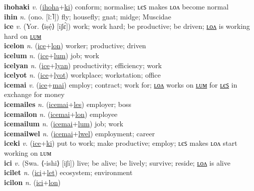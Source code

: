 \textbf{ihohaki} \textit{v.} (\hyperref[ihoha]{ihoha}+\hyperref[ki]{ki})
conform; normalise; ʟєꜱ makes ʟᴏᴧ become normal \label{ihohaki} \\
\textbf{ihin} \textit{n.} (ono. [ĩː˥])
fly; housefly; gnat; midge; Muscidae \label{ihin} \\
\textbf{ice} \textit{v.} (Yor. ⟨iṣẹ́⟩ [īʃɛ́])
work; work hard; be productive; be driven; \hyperref[icelon]{ʟᴏᴧ} is working hard on \hyperref[icelum]{ʟᴜᴍ} \label{ice} \\
\textbf{icelon} \textit{n.} (\hyperref[ice]{ice}+\hyperref[lon]{lon})
worker; productive; driven \label{icelon} \\
\textbf{icelum} \textit{n.} (\hyperref[ice]{ice}+\hyperref[lum]{lum})
job; work \label{icelum} \\
\textbf{icelyan} \textit{n.} (\hyperref[ice]{ice}+\hyperref[lyan]{lyan})
productivity; efficiency; work \label{icelyan} \\
\textbf{icelyot} \textit{n.} (\hyperref[ice]{ice}+\hyperref[lyot]{lyot})
workplace; workstation; office \label{icelyot} \\
\textbf{icemai} \textit{v.} (\hyperref[ice]{ice}+\hyperref[mai]{mai})
employ; contract; work for; \hyperref[icemailon]{ʟᴏᴧ} works on \hyperref[icemailum]{ʟᴜᴍ} for \hyperref[icemailes]{ʟєꜱ} in exchange for money \label{icemai} \\
\textbf{icemailes} \textit{n.} (\hyperref[icemai]{icemai}+\hyperref[les]{les})
employer; boss \label{icemailes} \\
\textbf{icemailon} \textit{n.} (\hyperref[icemai]{icemai}+\hyperref[lon]{lon})
employee \label{icemailon} \\
\textbf{icemailum} \textit{n.} (\hyperref[icemai]{icemai}+\hyperref[lum]{lum})
job; work \label{icemailum} \\
\textbf{icemailwel} \textit{n.} (\hyperref[icemai]{icemai}+\hyperref[lwel]{lwel})
employment; career \label{icemailwel} \\
\textbf{iceki} \textit{v.} (\hyperref[ice]{ice}+\hyperref[ki]{ki})
put to work; make productive; employ; ʟєꜱ makes ʟᴏᴧ start working on ʟᴜᴍ \label{iceki} \\
\textbf{ici} \textit{v.} (Swa. ⟨-ishi⟩ [iʃi])
live; be alive; be lively; survive; reside; \hyperref[icilon]{ʟᴏᴧ} is alive \label{ici} \\
\textbf{icilet} \textit{n.} (\hyperref[ici]{ici}+\hyperref[let]{let})
ecosystem; environment \label{icilet} \\
\textbf{icilon} \textit{n.} (\hyperref[ici]{ici}+\hyperref[lon]{lon})
